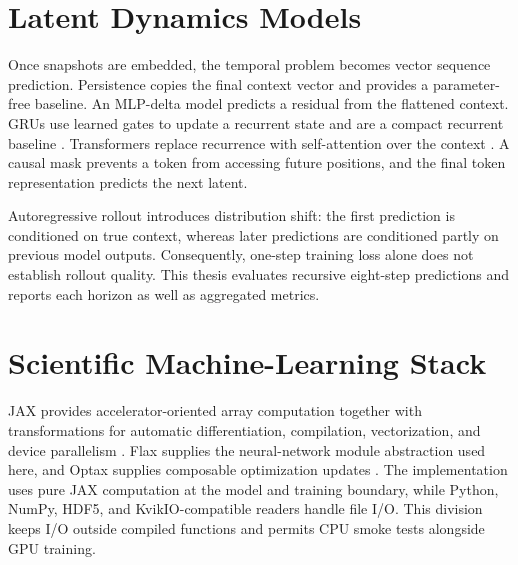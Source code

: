 \section{Latent Dynamics Models}

Once snapshots are embedded, the temporal problem becomes vector sequence prediction. Persistence
copies the final context vector and provides a parameter-free baseline. An MLP-delta model predicts
a residual from the flattened context. GRUs use learned gates to update a recurrent state and are a
compact recurrent baseline \citep{cho2014gru}. Transformers replace recurrence with self-attention
over the context \citep{vaswani2017attention}. A causal mask prevents a token from accessing future
positions, and the final token representation predicts the next latent.

Autoregressive rollout introduces distribution shift: the first prediction is conditioned on true
context, whereas later predictions are conditioned partly on previous model outputs. Consequently,
one-step training loss alone does not establish rollout quality. This thesis evaluates recursive
eight-step predictions and reports each horizon as well as aggregated metrics.

\section{Scientific Machine-Learning Stack}

JAX provides accelerator-oriented array computation together with transformations for automatic
differentiation, compilation, vectorization, and device parallelism \citep{jax2026}. Flax supplies
the neural-network module abstraction used here, and Optax supplies composable optimization
updates \citep{flax2026,optax2026}. The implementation uses pure JAX computation at the model and
training boundary, while Python, NumPy, HDF5, and KvikIO-compatible readers handle file I/O. This
division keeps I/O outside compiled functions and permits CPU smoke tests alongside GPU training.
